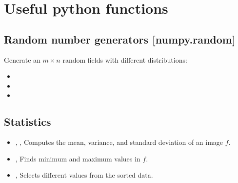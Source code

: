 \documentclass[letterpaper,10pt,english]{sphinxmanual}
\begin{document}
\noindent{}


\section{Useful python functions}
\label{\detokenize{02-ImageEnhancement:useful-python-functions}}

\subsection{Random number generators {[}numpy.random{]}}
\label{\detokenize{02-ImageEnhancement:random-number-generators-numpy-random}}
\sphinxAtStartPar
Generate an \(m \times n\) random fields with different distributions:
\begin{itemize}
\item {} 
\sphinxAtStartPar
{} 

\item {} 
\sphinxAtStartPar
{} 

\item {} 
\sphinxAtStartPar
{} 

\end{itemize}


\subsection{Statistics}
\label{\detokenize{02-ImageEnhancement:statistics}}\begin{itemize}
\item {} 
\sphinxAtStartPar
{}, ,  Computes the mean, variance, and standard deviation of an image \(f\).

\item {} 
\sphinxAtStartPar
{}, Finds minimum and maximum values in \(f\).

\item {} 
\sphinxAtStartPar
{},  Selects different values from the sorted data.

\end{itemize}
\end{document}
